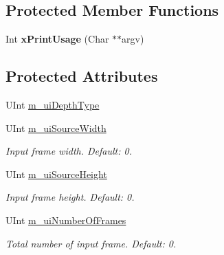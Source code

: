 \subsection*{Protected Member Functions}
\begin{DoxyCompactItemize}
\item 
\mbox{\label{class_c_parameter_view_interpolation_a92a566cd47c6373ada412b7390a63d24}} 
Int {\bfseries x\+Print\+Usage} (Char $\ast$$\ast$argv)
\end{DoxyCompactItemize}
\subsection*{Protected Attributes}
\begin{DoxyCompactItemize}
\item 
U\+Int \hyperlink{class_c_parameter_view_interpolation_ad129c82c944146c2433758a88671acef}{m\+\_\+ui\+Depth\+Type}
\item 
\mbox{\label{class_c_parameter_view_interpolation_abad31f5db95ef3bc590bb7d3ba62290b}} 
U\+Int \hyperlink{class_c_parameter_view_interpolation_abad31f5db95ef3bc590bb7d3ba62290b}{m\+\_\+ui\+Source\+Width}
\begin{DoxyCompactList}\small\item\em Input frame width. Default\+: 0. \end{DoxyCompactList}\item 
\mbox{\label{class_c_parameter_view_interpolation_a204bc8d1c5630f4de4bbcb93bcf70676}} 
U\+Int \hyperlink{class_c_parameter_view_interpolation_a204bc8d1c5630f4de4bbcb93bcf70676}{m\+\_\+ui\+Source\+Height}
\begin{DoxyCompactList}\small\item\em Input frame height. Default\+: 0. \end{DoxyCompactList}\item 
\mbox{\label{class_c_parameter_view_interpolation_abd8e092068896fc0ff436c7033bf1300}} 
U\+Int \hyperlink{class_c_parameter_view_interpolation_abd8e092068896fc0ff436c7033bf1300}{m\+\_\+ui\+Number\+Of\+Frames}
\begin{DoxyCompactList}\small\item\em Total number of input frame. Default\+: 0. \end{DoxyCompactList}\item 

\end{DoxyCompactItemize}
